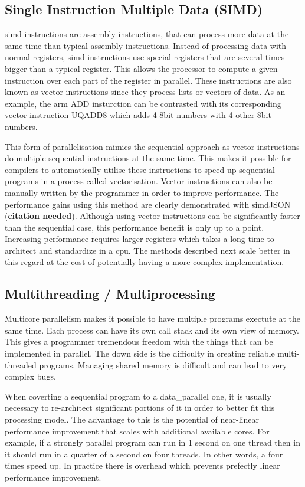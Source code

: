 \subsection{Single Instruction Multiple Data (SIMD)}
\gls{simd} instructions are assembly instructions, that can process more data
at the same time than typical assembly instructions. Instead of processing
data with normal registers, \gls{simd} instructions use special registers that
are several times bigger than a typical register. This allows the processor to
compute a given instruction over each part of the register in parallel. These
instructions are also known as vector instructions since they process lists or
vectors of data. As an example, the arm ADD insturction can be contrasted with
its corresponding vector instruction UQADD8 which adds 4 8bit numbers with 4
other 8bit numbers.

This form of parallelisation mimics the sequential approach as vector
instructions do multiple sequential instructions at the same time. This makes
it possible for compilers to automatically utilise these instructions to speed
up sequential programs in a process called vectorisation. Vector instructions
can also be manually written by the programmer in order to improve performance.
The performance gains using this method are clearly demonstrated with
simdJSON (\textbf{citation needed}). Although using vector instructions can be
significantly faster than the sequential case, this performance benefit is only
up to a point. Increasing performance requires larger registers which takes a
long time to architect and standardize in a \gls{cpu}. The methods described next
scale better in this regard at the cost of potentially having a more complex
implementation.

\subsection{Multithreading / Multiprocessing}
Multicore parallelism makes it possible to have multiple programs exectute at
the same time. Each process can have its own call stack and its own view of
memory. This gives a programmer tremendous freedom with the things that can be
implemented in parallel. The down side is the difficulty in creating reliable
multi-threaded programs. Managing shared memory is difficult and can lead to
very complex bugs.

When coverting a sequential program to a \gls{data_parallel} one, it is usually
necessary to re-architect significant portions of it in order to better fit
this processing model. The advantage to this is the potential of near-linear
performance improvement that scales with additional available cores. For
example, if a strongly parallel program can run in 1 second on one thread then
in it should run in a quarter of a second on four threads. In other words, a
four times speed up. In practice there is overhead which prevents prefectly
linear performance improvement.


